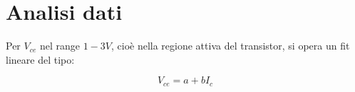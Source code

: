 \documentclass{article}
\begin{document}
\section{Analisi dati}
Per $V_{ce}$ nel range $1-3 V$, cioè nella regione attiva del transistor, si opera un fit lineare del tipo:

\begin{equation}
    V_{ce} = a + b I_c
\end{equation}
\end{document}
